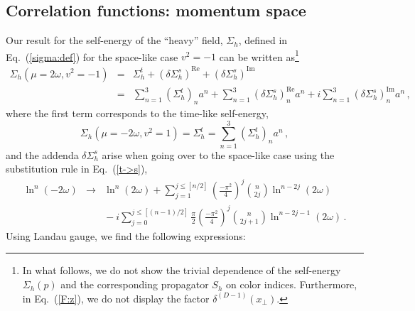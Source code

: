\documentclass[12pt]{article}
\numberwithin{equation}{section}
\newcommand{\1}[1]{\mathbf{1}^{#1}}
\newcommand{\2}[1]{\mathbf{2}^{#1}}
\newcommand{\3}[1]{\mathbf{3}^{#1}}
\newcommand{\4}[1]{\mathbf{4}^{#1}}
\newcommand{\5}[1]{\mathbf{5}^{#1}}
\newcommand{\mlabel}[1]{ \text{\footnotesize \hspace{3mm}\fbox{\fbox{$#1$}} \label{#1}}}
\renewcommand{\mlabel}[1]{\label{#1}}
\newcommand{\beq}{\begin{equation}}
\newcommand{\eeq}{\end{equation}}
\newcommand{\re}[1]{(\ref{#1})}
\newcommand{\Si}{\Sigma}
\newcommand{\om}{\omega}
\newcommand{\vv}{v^2}
\begin{document}
\subsection{Correlation functions: momentum space}
Our result for the self-energy of the ``heavy'' field, $\Si_h$, defined in Eq.~\re{sigma:def} 
for the space-like case $\vv=-1$ can be written as\footnote{%
In what follows, we do not show  the trivial  dependence of the self-energy $\Si_h(p)$ and
the corresponding propagator $S_h$ on color indices. Furthermore, in Eq.~\re{F:z},  we do not  display
the  factor $\delta^{(D-1)}(x_{\perp})$.}
\begin{eqnarray}
\Si_h(\mu = 2 \om, \vv =-1) &=&  \Si_h^t + (\delta \Si_h^s)^{\text{Re}} + (\delta \Si_h^s)^{\text{Im}}
\nonumber\\
&=&\sum_{n=1}^3 (\Si^t_h)_n a^n + \sum_{n=1}^3 (\delta \Si_h^s)^{\text{Re}}_n  a^n + i \sum_{n=1}^3 (\delta \Si_h^s)^{\text{Im}}_n a^n\,, 
\end{eqnarray}
where the first term corresponds to the time-like self-energy, 
\beq
\Si_h(\mu = -2 \om, \vv =1)= \Si_h^t =
\sum_{n=1}^3 (\Si^t_h)_n a^n  
\mlabel{Si:t-case}
\,,
\eeq
and the addenda $\delta\Si^s_h$ arise when going over to the space-like case using the substitution rule in Eq.~\re{t->s}, 
\begin{eqnarray}
\ln^n(-2\om) &\to&  \ln^n(2\om)
+ \sum_{j=1}^{j \le [n/2]} \left(\frac{-\pi^2}{4}\right)^j\binom{n}{2j}
 \ln^{n-2j}(2\om)
\nonumber\\
&&{} -i  \sum_{j=0}^{j \le [(n-1)/2]} \frac{\pi}{2}\left(\frac{-\pi^2}{4}\right)^j\binom{n}{2j+1} \ln^{n-2j-1}(2\om)
\,.
\end{eqnarray}
Using Landau gauge, we find the following expressions: 
\end{document}

